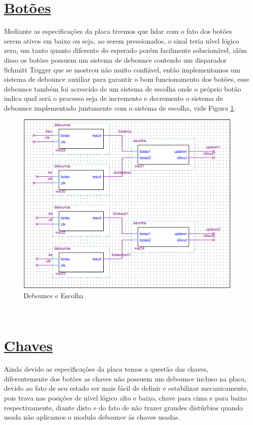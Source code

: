 \documentclass[14pt, oneside]{book}
\newcommand\tab[1][1cm]{\hspace*{#1}}
\theoremstyle{definition}
\begin{document}
                
            \section[Botões]{\hyperlink{toc}{Botões}}
                \tab  Mediante as especificações da placa tivemos que lidar com o fato dos botões serem ativos em baixo ou seja, ao serem pressionados, o sinal teria nível lógico zero, um tanto quanto diferente do esperado porém facilmente solucionável, além disso os botões possuem um sistema de debounce contendo um disparador Schmitt Trigger que se mostrou não muito confiável, então implementamos um sistema de debounce auxiliar para garantir o bom funcionamento dos botões, esse debounce também foi acrescido de um sistema de escolha onde o próprio botão indica qual será o processo seja de incremento e decremento o sistema de debounce implementado juntamente com o sistema de escolha, vide Figura \ref{fig:debounce2}. \\
                
                
                \begin{figure}[H]
                    \centering
                    \includegraphics[scale=0.7]{debounce2.png}
                    \caption{Debounce e Escolha}
                    \label{fig:debounce2}
                \end{figure} \\
                
                
            \section[Chaves]{\hyperlink{toc}{Chaves}}
                \tab Ainda devido as especificações da placa temos a questão das chaves, diferentemente dos botões as chaves não possuem um debounce incluso na placa, devido ao fato de seu estado ser mais fácil de definir e estabilizar mecanicamente, pois trava nas posições de nível lógico alto e baixo, chave para cima e para baixo respectivamente, diante disto e do fato de não trazer grandes distúrbios quando usada não aplicamos o modulo debounce às chaves usadas.\\
\end{document}
